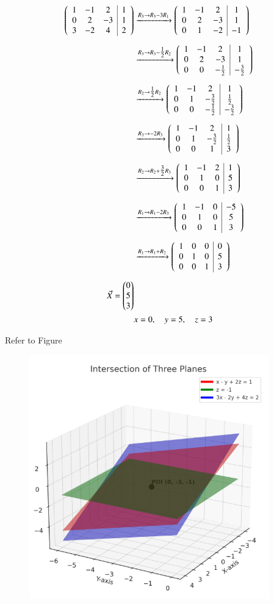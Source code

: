 \documentclass[journal]{IEEEtran}
\newcommand{\augvec}[3]{%
  \left(\begin{array}{*{#1}{c}|*{#2}{c}}
  #3
  \end{array}\right)}
\begin{document}
\begin{align}
\augvec{3}{1}{
1 & -1 & 2 & 1 \\
0 & 2 & -3 & 1 \\
3 & -2 & 4 & 2}
&\xrightarrow{R_3 \to R_3 - 3R_1}
\augvec{3}{1}{
1 & -1 & 2 & 1 \\
0 & 2 & -3 & 1 \\
0 & 1 & -2 & -1} \\[6pt]
&\xrightarrow{R_3 \to R_3 - \tfrac{1}{2} R_2}
\augvec{3}{1}{
1 & -1 & 2 & 1 \\
0 & 2 & -3 & 1 \\
0 & 0 & -\tfrac{1}{2} & -\tfrac{3}{2}} \\[6pt]
&\xrightarrow{R_2 \to \tfrac{1}{2} R_2}
\augvec{3}{1}{
1 & -1 & 2 & 1 \\
0 & 1 & -\tfrac{3}{2} & \tfrac{1}{2} \\
0 & 0 & -\tfrac{1}{2} & -\tfrac{3}{2}} \\[6pt]
&\xrightarrow{R_3 \to -2 R_3}
\augvec{3}{1}{
1 & -1 & 2 & 1 \\
0 & 1 & -\tfrac{3}{2} & \tfrac{1}{2} \\
0 & 0 & 1 & 3} \\[6pt]
&\xrightarrow{R_2 \to R_2 + \tfrac{3}{2} R_3}
\augvec{3}{1}{
1 & -1 & 2 & 1 \\
0 & 1 & 0 & 5 \\
0 & 0 & 1 & 3} \\[6pt]
&\xrightarrow{R_1 \to R_1 - 2R_3}
\augvec{3}{1}{
1 & -1 & 0 & -5 \\
0 & 1 & 0 & 5 \\
0 & 0 & 1 & 3} \\[6pt]
&\xrightarrow{R_1 \to R_1 + R_2}
\augvec{3}{1}{
1 & 0 & 0 & 0 \\
0 & 1 & 0 & 5 \\
0 & 0 & 1 & 3} \\[6pt]
      \Vec{X}=\myvec{0
                    \\
                     5
                    \\
                     3}\\
&x = 0, \quad y = 5, \quad z = 3
\end{align}





Refer to Figure

\begin{figure}[H]
\begin{center}
\includegraphics[width=0.6\columnwidth]{figs/graph9.png}
\end{center}
\caption{}
\label{fig:Fig}
\end{figure}
\end{document}
